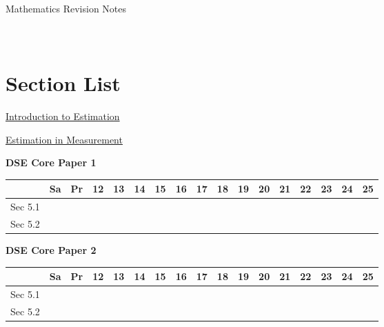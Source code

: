 \documentclass[12pt, a4paper]{article}
\begin{document}
\newpage
\newpage
\thispagestyle{empty}
\begin{center}
Mathematics Revision Notes\\\vspace{1cm}
\\\vspace{1cm}
{\fontsize{24pt}{24pt}\selectfont {Estimation in Numbers and Measurement}} \\\vspace{1cm}
\label{chapter:S1-5}

\end{center}
\vspace{0.5cm}
\hline
\section*{Section List}
\begin{enumx}[label=Sec 5.\arabic*\ ]
\item \hyperref[section:1-5-1]{Introduction to Estimation}
\item \hyperref[section:1-5-2]{Estimation in Measurement}
\end{enumx}
\begin{absolutelynopagebreak}
\begin{center}
\textbf{DSE Core Paper 1}
\end{center}
\begin{center}
\begin{tabular}{|l|c|c|c|c|c|c|c|c|c|c|c|c|c|c|c|c|}
\hline
        & Sa & Pr & 12 & 13 & 14 & 15 & 16 & 17 & 18 & 19 & 20 & 21 & 22 & 23 & 24 & 25 \\\hline\hline
Sec 5.1 &  &  &  &  &  &  &  &  &  &  &  &  &  &  &  &  \\\hline
Sec 5.2 &  &  &  &  &  &  &  &  &  &  &  &  &  &  &  &  \\\hline
\end{tabular}
\end{center}
\end{absolutelynopagebreak}
\begin{absolutelynopagebreak}
\begin{center}
\textbf{DSE Core Paper 2}
\end{center}
\begin{center}
\begin{tabular}{|l|c|c|c|c|c|c|c|c|c|c|c|c|c|c|c|c|}
\hline
        & Sa & Pr & 12 & 13 & 14 & 15 & 16 & 17 & 18 & 19 & 20 & 21 & 22 & 23 & 24 & 25 \\\hline\hline
Sec 5.1 &  &  &  &  &  &  &  &  &  &  &  &  &  &  &  &  \\\hline
Sec 5.2 &  &  &  &  &  &  &  &  &  &  &  &  &  &  &  &  \\\hline
\end{tabular}
\end{center}
\end{absolutelynopagebreak}
\end{document}

